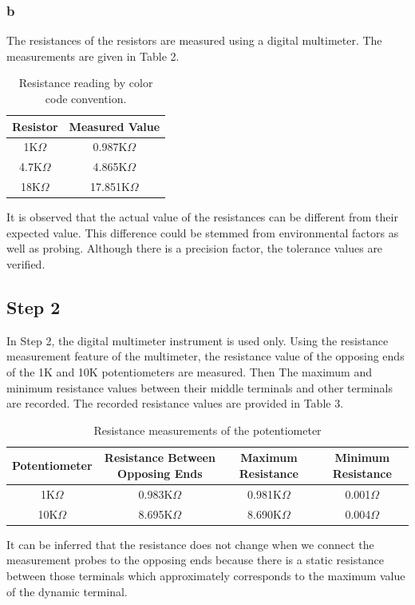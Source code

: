 \documentclass[letterpaper,12pt]{article}
\begin{document}
\subsubsection{b} 
The resistances of the resistors are measured using a digital multimeter. The measurements are given in Table 2. \begin{table}[H]
	\begin{center}
		\begin{tabular}{||c | c ||} 
		 \hline
		 Resistor & Measured Value \\ [0.5ex] 
		 \hline\hline
		 1K\( \Omega \) & 0.987K\( \Omega \)  \\ 
		 \hline
	     4.7K\( \Omega \) & 4.865K\( \Omega \)   \\
		 \hline
		 18K\( \Omega \) & 17.851K\( \Omega \)  \\ [1ex] 
		 \hline
		\end{tabular}
	\end{center}
	\caption{Resistance reading by color code convention.}
	\end{table}
	

It is observed that the actual value of the resistances can be different from their expected value. This difference could be stemmed from environmental factors as well as probing. Although there is a precision factor, the tolerance values are verified. 
\subsection{Step 2}
In Step 2, the digital multimeter instrument is used only. Using the resistance measurement feature of the multimeter, the resistance value of the opposing ends of the 1K and 10K potentiometers are measured. Then The maximum and minimum resistance values between their middle terminals and other terminals are recorded.
The recorded resistance values are provided in Table 3.
\begin{table}[H]
	\begin{center}
		\begin{tabular}{|| c | c | c | c ||} 
		 \hline
		 Potentiometer & Resistance Between Opposing Ends &  Maximum Resistance & Minimum Resistance\\ [0.5ex] 
		 \hline\hline
		 1K\( \Omega \) & 0.983K\( \Omega \) & 0.981K\( \Omega \) & 0.001\( \Omega \) \\ 
		 \hline
	     10K\( \Omega \) & 8.695K\( \Omega \) & 8.690K\( \Omega \) & 0.004\( \Omega \)  \\
		 \hline
		\end{tabular}
	\end{center}
	\caption{Resistance measurements of the potentiometer}
	\end{table}
It can be inferred that the resistance does not change when we connect the measurement probes to the opposing ends because there is a static resistance between those terminals which approximately corresponds to the maximum value of the dynamic terminal.  
\end{document}
